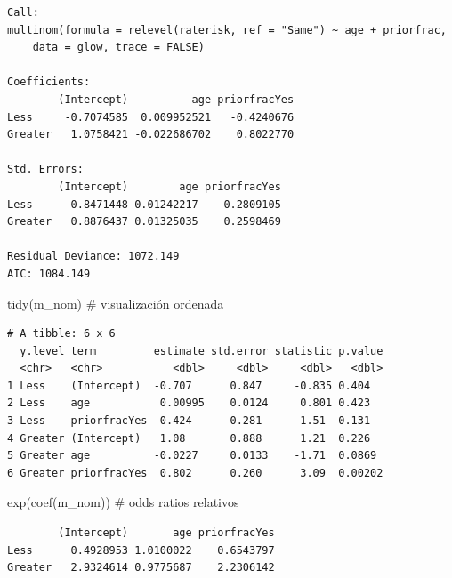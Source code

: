 \documentclass[
  letterpaper,
  DIV=11,
  numbers=noendperiod]{scrartcl}
\newenvironment{Shaded}{\begin{snugshade}}{\end{snugshade}}
\newcommand{\CommentTok}[1]{\textcolor[rgb]{0.37,0.37,0.37}{#1}}
\newcommand{\FunctionTok}[1]{\textcolor[rgb]{0.28,0.35,0.67}{#1}}
\newcommand{\NormalTok}[1]{\textcolor[rgb]{0.00,0.23,0.31}{#1}}
\begin{document}
\begin{verbatim}
Call:
multinom(formula = relevel(raterisk, ref = "Same") ~ age + priorfrac, 
    data = glow, trace = FALSE)

Coefficients:
        (Intercept)          age priorfracYes
Less     -0.7074585  0.009952521   -0.4240676
Greater   1.0758421 -0.022686702    0.8022770

Std. Errors:
        (Intercept)        age priorfracYes
Less      0.8471448 0.01242217    0.2809105
Greater   0.8876437 0.01325035    0.2598469

Residual Deviance: 1072.149 
AIC: 1084.149 
\end{verbatim}

\begin{Shaded}
\begin{Highlighting}[]
\FunctionTok{tidy}\NormalTok{(m\_nom) }\CommentTok{\# visualización ordenada}
\end{Highlighting}
\end{Shaded}

\begin{verbatim}
# A tibble: 6 x 6
  y.level term         estimate std.error statistic p.value
  <chr>   <chr>           <dbl>     <dbl>     <dbl>   <dbl>
1 Less    (Intercept)  -0.707      0.847     -0.835 0.404  
2 Less    age           0.00995    0.0124     0.801 0.423  
3 Less    priorfracYes -0.424      0.281     -1.51  0.131  
4 Greater (Intercept)   1.08       0.888      1.21  0.226  
5 Greater age          -0.0227     0.0133    -1.71  0.0869 
6 Greater priorfracYes  0.802      0.260      3.09  0.00202
\end{verbatim}

\begin{Shaded}
\begin{Highlighting}[]
\FunctionTok{exp}\NormalTok{(}\FunctionTok{coef}\NormalTok{(m\_nom))      }\CommentTok{\# odds ratios relativos}
\end{Highlighting}
\end{Shaded}

\begin{verbatim}
        (Intercept)       age priorfracYes
Less      0.4928953 1.0100022    0.6543797
Greater   2.9324614 0.9775687    2.2306142
\end{verbatim}
\end{document}
